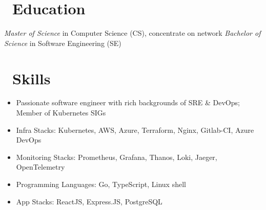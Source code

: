 \documentclass{resume}
\begin{document}



\section{\faGraduationCap\ Education}
\textit{Master of Science} in Computer Science (CS), concentrate on network
\textit{Bachelor of Science} in Software Engineering (SE)

\section{\faCogs\ Skills}
\begin{itemize}[parsep=0.5ex]
  \item Passionate software engineer with rich backgrounds of SRE \& DevOps; Member of Kubernetes SIGs
  \item Infra Stacks: Kubernetes, AWS, Azure, Terraform, Nginx, Gitlab-CI, Azure DevOps
  \item Monitoring Stacks: Prometheus, Grafana, Thanos, Loki, Jaeger, OpenTelemetry
  \item Programming Languages: Go, TypeScript, Linux shell
  \item App Stacks: ReactJS, Express.JS, PostgreSQL
\end{itemize}
\end{document}
